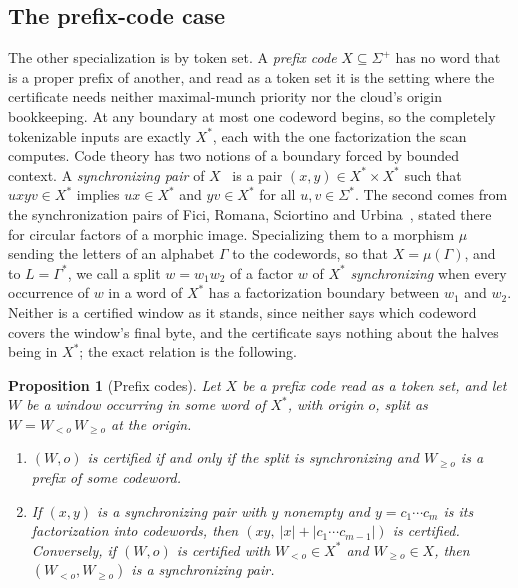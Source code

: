 \documentclass[11pt,a4paper]{article}
\theoremstyle{definition}
\theoremstyle{plain}
\newtheorem{proposition}{Proposition}
\begin{document}
\subsection{The prefix-code case}
\label{sec:codes}

The other specialization is by token set. A \emph{prefix code} $X \subseteq \Sigma^+$ has no word that is a proper
prefix of another, and read as a token set it is the setting where the certificate needs neither maximal-munch priority
nor the cloud's origin bookkeeping. At any boundary at most one codeword begins, so the completely tokenizable inputs
are exactly $X^*$, each with the one factorization the scan computes. Code theory has two notions of a boundary forced
by bounded context. A \emph{synchronizing pair} of $X$~\cite[p.~375]{berstel2010codes} is a pair
$(x, y) \in X^* \times X^*$ such that $u x y v \in X^*$ implies $u x \in X^*$ and $y v \in X^*$ for all
$u, v \in \Sigma^*$. The second comes from the synchronization pairs of Fici, Romana, Sciortino and
Urbina~\cite[Section~3.3]{fici2025morphisms}, stated there for circular factors of a morphic image. Specializing them to
a morphism $\mu$ sending the letters of an alphabet $\Gamma$ to the codewords, so that $X = \mu(\Gamma)$, and to
$L = \Gamma^*$, we call a split $w = w_1 w_2$ of a factor $w$ of $X^*$ \emph{synchronizing} when every occurrence of $w$
in a word of $X^*$ has a factorization boundary between $w_1$ and $w_2$. Neither is a certified window as it stands,
since neither says which codeword covers the window's final byte, and the certificate says nothing about the halves
being in $X^*$; the exact relation is the following.

\begin{proposition}[Prefix codes]
\label{prop:codes}
Let $X$ be a prefix code read as a token set, and let $W$ be a window occurring in some word of $X^*$, with origin $o$,
split as $W = W_{<o}\, W_{\geq o}$ at the origin.
\begin{enumerate}
\item $(W, o)$ is certified if and only if the split is synchronizing and $W_{\geq o}$ is a prefix of some codeword.
\item If $(x, y)$ is a synchronizing pair with $y$ nonempty and $y = c_1 \cdots c_m$ is its factorization into
codewords, then $(xy,\ |x| + |c_1 \cdots c_{m-1}|)$ is certified. Conversely, if $(W, o)$ is certified with
$W_{<o} \in X^*$ and $W_{\geq o} \in X$, then $(W_{<o}, W_{\geq o})$ is a synchronizing pair.
\end{enumerate}
\end{proposition}
\end{document}

